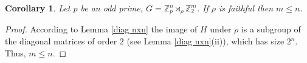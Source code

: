\documentclass[a4paper, english, 9pt]{amsart}
\theoremstyle{plain}
\newtheorem{corollary}[theorem]{Corollary}
\newtheorem{lemma}[theorem]{Lemma}
\theoremstyle{definition}
\def\ker#1{\mathrm{ker}(#1)}
\def\comment#1{{\color{red} #1}}
\def\Z{\mathbb Z}
\begin{document}
\begin{corollary} \label{ro faithful on Z_p}
    Let $p$ be an odd prime, $G=\Z_p^n\rtimes_\rho \Z_2^m$. If $\rho$ is faithful then $m\leq n$.
\end{corollary}

\begin{proof}
    According to Lemma \ref{diag nxn} the image of $H$ under $\rho$ is a subgroup of the diagonal matrices of order $2$ (see Lemma \ref{diag nxn}(ii)), which has size $2^n$. Thus, $m\leq n$. 
\end{proof}



 






\end{document}
